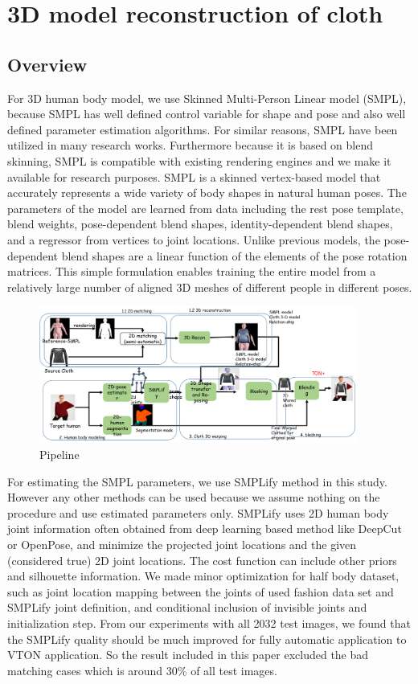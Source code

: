 \section{3D model reconstruction of cloth} \label{section:3dclothrecon}

\subsection{Overview} 

For 3D human body model, we use Skinned Multi-Person Linear model (SMPL)\cite{Loper2015SMPLAS}, because SMPL has well defined control variable for shape and pose and also well defined parameter estimation  algorithms. For similar reasons, SMPL have been utilized in many research works. Furthermore because it is based on blend skinning, SMPL is compatible with existing rendering engines and we make it available for research purposes. SMPL is a skinned vertex-based model that accurately represents a wide variety of body shapes in natural human poses. The parameters of the model are learned from data including the rest pose template, blend weights, pose-dependent blend shapes, identity-dependent blend shapes, and a regressor from vertices to joint locations. Unlike previous models, the pose-dependent blend shapes are a linear function of the elements of the pose rotation matrices. This simple formulation enables training the entire model from a relatively large number of aligned 3D meshes of different people in different poses. \cite{Loper2015SMPLAS} 


\begin{figure}[t]
\centering
\includegraphics[height=4.5cm, scale=1]{figures/pipeline.png}   %
\caption{Pipeline}
\label{fig:piepline}
\end{figure}


For estimating the SMPL parameters, we use SMPLify\cite{Bogo2016SMPLify} method in this study. However any other methods can be used because we assume nothing on the procedure and use estimated parameters only. SMPLify uses 2D human body joint information often obtained from deep learning based method like DeepCut or OpenPose, and minimize the projected joint locations and the given (considered true) 2D joint locations. The cost function can include other priors and silhouette information. We made minor optimization for half body dataset, such as joint location mapping between the joints of used fashion data set and SMPLify joint definition, and conditional inclusion of invisible joints and initialization step.  From our experiments with all 2032 test images, we found that the SMPLify quality should be much improved for fully automatic application to VTON application. So the result included in this paper excluded the bad matching cases which is around 30\% of all test images.    
  
